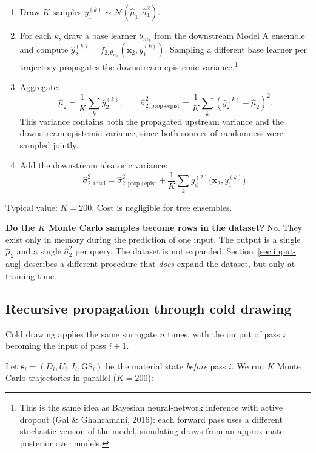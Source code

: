 \documentclass[11pt,a4paper]{article}
\begin{document}
\begin{enumerate}
    \item Draw $K$ samples $y_1^{(k)} \sim \mathcal{N}(\hat\mu_1, \hat\sigma_1^2)$.
    \item For each $k$, draw a base learner $\theta_{m_k}$ from the downstream Model A ensemble and compute $\hat y_2^{(k)} = f_{2, \theta_{m_k}}(\bm x_2, y_1^{(k)})$. Sampling a different base learner per trajectory propagates the downstream epistemic variance.\footnote{This is the same idea as Bayesian neural-network inference with active dropout (Gal \& Ghahramani, 2016): each forward pass uses a different stochastic version of the model, simulating draws from an approximate posterior over models.}
    \item Aggregate:
    \[
    \hat\mu_2 = \frac{1}{K}\sum_k \hat y_2^{(k)}, \qquad
    \hat\sigma^2_{2,\text{prop+epist}} = \frac{1}{K}\sum_k (\hat y_2^{(k)} - \hat\mu_2)^2.
    \]
    This variance contains both the propagated upstream variance and the downstream epistemic variance, since both sources of randomness were sampled jointly.
    \item Add the downstream aleatoric variance:
    \[
    \hat\sigma^2_{2,\text{total}} = \hat\sigma^2_{2,\text{prop+epist}} + \frac{1}{K}\sum_k g_\phi^{(2)}\!\big(\bm x_2, y_1^{(k)}\big).
    \]
\end{enumerate}
Typical value: $K = 200$. Cost is negligible for tree ensembles.

\begin{cautionbox}
\textbf{Do the $K$ Monte Carlo samples become rows in the dataset?} No. They exist only in memory during the prediction of one input. The output is a single $\hat\mu_2$ and a single $\hat\sigma_2^2$ per query. The dataset is not expanded. Section~\ref{sec:input-aug} describes a different procedure that \emph{does} expand the dataset, but only at training time.
\end{cautionbox}

\subsection{Recursive propagation through cold drawing}
\label{sec:propagation-cd}

Cold drawing applies the same surrogate $n$ times, with the output of pass $i$ becoming the input of pass $i+1$.

Let $\bm s_i = (D_i, U_i, I_i, \mathrm{GS}_i)$ be the material state \emph{before} pass $i$. We run $K$ Monte Carlo trajectories in parallel ($K = 200$):
\end{document}
